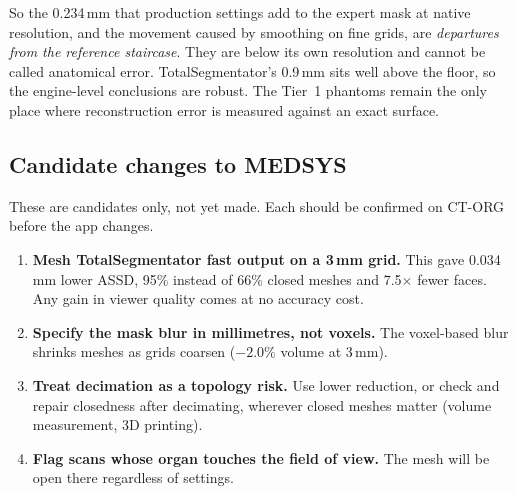 \documentclass[10pt,a4paper]{article}
\begin{document}
So the 0.234\,mm that production settings add to the expert mask at native resolution, and the movement caused by smoothing on fine grids, are \emph{departures from the reference staircase}. They are below its own resolution and cannot be called anatomical error. TotalSegmentator's 0.9\,mm sits well above the floor, so the engine-level conclusions are robust. The Tier~1 phantoms remain the only place where reconstruction error is measured against an exact surface.

\subsection{Candidate changes to MEDSYS}
These are candidates only, not yet made. Each should be confirmed on CT-ORG before the app changes.

\begin{enumerate}
\item \textbf{Mesh TotalSegmentator fast output on a 3\,mm grid.} This gave 0.034\,mm lower ASSD, 95\% instead of 66\% closed meshes and 7.5$\times$ fewer faces. Any gain in viewer quality comes at no accuracy cost.
\item \textbf{Specify the mask blur in millimetres, not voxels.} The voxel-based blur shrinks meshes as grids coarsen ($-2.0\%$ volume at 3\,mm).
\item \textbf{Treat decimation as a topology risk.} Use lower reduction, or check and repair closedness after decimating, wherever closed meshes matter (volume measurement, 3D printing).
\item \textbf{Flag scans whose organ touches the field of view.} The mesh will be open there regardless of settings.
\end{enumerate}
\end{document}

